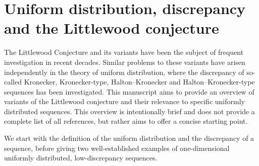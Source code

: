 \documentclass{article}
\renewcommand{\(}{\left (}
\renewcommand{\)}{\right )}
\theoremstyle{definition}
\numberwithin{equation}{section}
\begin{document}
\section{Uniform distribution, discrepancy and the Littlewood conjecture}\label{sec:1}

The Littlewood Conjecture and its variants have been the subject of frequent investigation in recent decades. Similar problems to these variants have arisen independently in the theory of uniform distribution, where the discrepancy of so-called Kronecker, Kronecker-type, Halton--Kronecker and Halton--Kronecker-type sequences has been investigated.
This manuscript aims to provide an overview of variants of the Littlewood conjecture and their relevance to specific uniformly distributed sequences. This overview is intentionally brief and does not provide a complete list of all references, but rather aims to offer a concise starting point. 

We start with the definition of the uniform distribution and the discrepancy of a sequence, before giving two well-established examples of one-dimensional uniformly distributed, low-discrepancy sequences.
\end{document}
